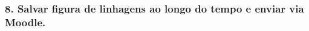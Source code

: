 \documentclass[
]{article}
\begin{document}
\hypertarget{salvar-figura-de-linhagens-ao-longo-do-tempo-e-enviar-via-moodle.}{%
\subsubsection{8. Salvar figura de linhagens ao longo do tempo e enviar
via
Moodle.}\label{salvar-figura-de-linhagens-ao-longo-do-tempo-e-enviar-via-moodle.}}
\end{document}
